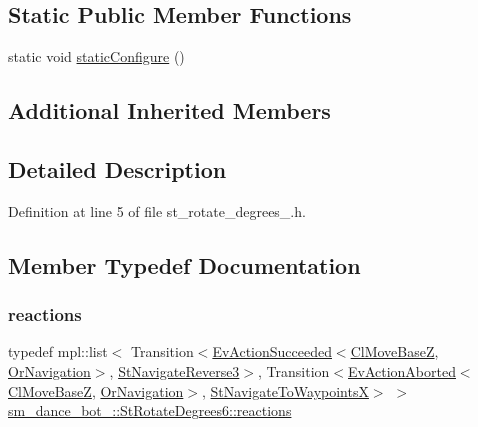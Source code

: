 \subsection*{Static Public Member Functions}
\begin{DoxyCompactItemize}
\item 
static void \hyperlink{structsm__dance__bot__2_1_1StRotateDegrees6_a61592eedf7748d25bbb80b8cbd2851be}{static\+Configure} ()
\end{DoxyCompactItemize}
\subsection*{Additional Inherited Members}


\subsection{Detailed Description}


Definition at line 5 of file st\+\_\+rotate\+\_\+degrees\+\_.\+h.



\subsection{Member Typedef Documentation}
\mbox{\label{structsm__dance__bot__2_1_1StRotateDegrees6_a86960851edf5d17292994c07a7a4f015}} 
\subsubsection{\texorpdfstring{reactions}{reactions}}
{\footnotesize\ttfamily typedef mpl\+::list$<$ Transition$<$\hyperlink{structsmacc_1_1default__events_1_1EvActionSucceeded}{Ev\+Action\+Succeeded}$<$\hyperlink{classcl__move__base__z_1_1ClMoveBaseZ}{Cl\+Move\+BaseZ}, \hyperlink{classsm__dance__bot__2_1_1OrNavigation}{Or\+Navigation}$>$, \hyperlink{structsm__dance__bot__2_1_1StNavigateReverse3}{St\+Navigate\+Reverse3}$>$, Transition$<$\hyperlink{structsmacc_1_1default__events_1_1EvActionAborted}{Ev\+Action\+Aborted}$<$\hyperlink{classcl__move__base__z_1_1ClMoveBaseZ}{Cl\+Move\+BaseZ}, \hyperlink{classsm__dance__bot__2_1_1OrNavigation}{Or\+Navigation}$>$, \hyperlink{structsm__dance__bot__2_1_1StNavigateToWaypointsX}{St\+Navigate\+To\+WaypointsX}$>$ $>$ \hyperlink{structsm__dance__bot__2_1_1StRotateDegrees6_a86960851edf5d17292994c07a7a4f015}{sm\+\_\+dance\+\_\+bot\+\_\+::\+St\+Rotate\+Degrees6\+::reactions}}



